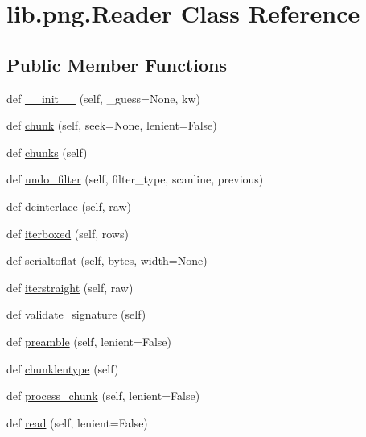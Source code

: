 \hypertarget{classlib_1_1png_1_1_reader}{}\section{lib.\+png.\+Reader Class Reference}
\label{classlib_1_1png_1_1_reader}
\subsection*{Public Member Functions}
\begin{DoxyCompactItemize}
\item 
def \hyperlink{classlib_1_1png_1_1_reader_a4f3aee6939d0cb1a6d978f9450b18fb3}{\+\_\+\+\_\+init\+\_\+\+\_\+} (self, \+\_\+guess=None, kw)
\item 
def \hyperlink{classlib_1_1png_1_1_reader_ab9802ec7e407d1ea9e5f69b9a0af1ed0}{chunk} (self, seek=None, lenient=False)
\item 
def \hyperlink{classlib_1_1png_1_1_reader_aed162ed2796599df4983036954a5e077}{chunks} (self)
\item 
def \hyperlink{classlib_1_1png_1_1_reader_af232a3eecd4d1644beba2d144feb76c7}{undo\+\_\+filter} (self, filter\+\_\+type, scanline, previous)
\item 
def \hyperlink{classlib_1_1png_1_1_reader_a19ec9a186e3fdf3a57601b3450ee0f5e}{deinterlace} (self, raw)
\item 
def \hyperlink{classlib_1_1png_1_1_reader_a5e9f2064e8d50af178d6e8d5aea74b47}{iterboxed} (self, rows)
\item 
def \hyperlink{classlib_1_1png_1_1_reader_a95f04a6a71588837a20247ce4a34423f}{serialtoflat} (self, bytes, width=None)
\item 
def \hyperlink{classlib_1_1png_1_1_reader_a46a25b00de431ed820a6624870aaff90}{iterstraight} (self, raw)
\item 
def \hyperlink{classlib_1_1png_1_1_reader_a7b26c3bd2f93d45ee288aee22b4ecfff}{validate\+\_\+signature} (self)
\item 
def \hyperlink{classlib_1_1png_1_1_reader_a9633656b8407495c98265f78ef92ad10}{preamble} (self, lenient=False)
\item 
def \hyperlink{classlib_1_1png_1_1_reader_a6cf6dd680cba262114a176e79bfc8637}{chunklentype} (self)
\item 
def \hyperlink{classlib_1_1png_1_1_reader_a26bf1df6ac7fca542b8dc0d035009ce8}{process\+\_\+chunk} (self, lenient=False)
\item 
def \hyperlink{classlib_1_1png_1_1_reader_abee96e12fc05a9024ebf916b1b90ac44}{read} (self, lenient=False)

\end{DoxyCompactItemize}
